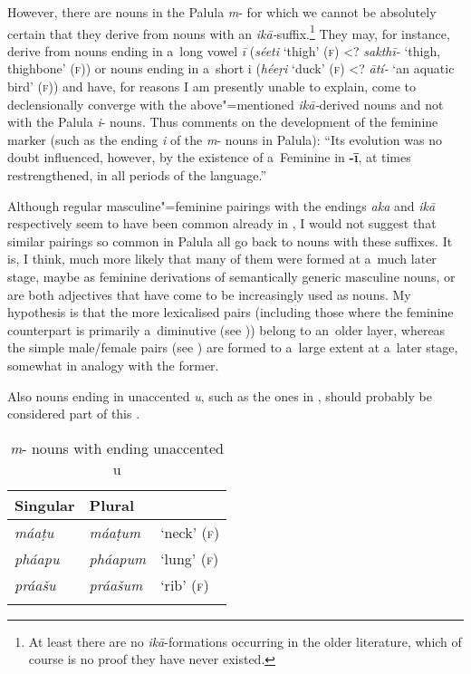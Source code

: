However, there are nouns in the Palula \textit{m}- for which we cannot be absolutely
certain that they derive from  nouns with an \textit{ikā-}suffix.\footnote{At least there are
  no \textit{ikā}-formations occurring in the older literature, which of course is no proof
  they have never existed.} They may, for instance, derive from nouns ending in a~long vowel
\textit{ī} (\textit{séeti} `thigh' (\textsc{f}) {\textless}? \textit{sakthī-} `thigh, thighbone' (\textsc{f})) or nouns ending in a~short i (\textit{héeṛi} `duck'
(\textsc{f}) {\textless}? \textit{ātí-} `an aquatic bird' (\textsc{f})) and have, for
reasons I am presently unable to explain, come to declensionally converge with the above"=mentioned
\textit{ikā-}derived nouns and not with the Palula \textit{i}- nouns. Thus
\citet[222]{masica1991} comments on the development of the  feminine marker (such as the ending
\textit{i} of the \textit{m}- nouns in Palula): ``Its evolution was no doubt influenced,
however, by the existence of a~Feminine in \textbf{-ī}, at times
restrengthened, in all periods of the language.''


Although regular masculine"=feminine pairings with the endings \textit{aka} and \textit{ikā}
respectively seem to have been common already in , I would not suggest that similar pairings so
common in Palula all go back to nouns with these suffixes. It is, I think, much more likely that
many of them were formed at a~much later stage, maybe as feminine derivations of semantically
generic masculine nouns, or are both adjectives that have come to be increasingly used as nouns. My
hypothesis is that the more lexicalised pairs (including those where the feminine counterpart is
primarily a~diminutive (see )) belong to an~older layer, whereas the simple
male/female pairs (see ) are formed to a~large extent at a~later stage, somewhat in
analogy with the former.


Also nouns ending in unaccented \textit{u}, such as the ones in , should probably be considered part of this . 



\begin{table}[ht]
\caption{\textit{m}- nouns with ending unaccented u}
\begin{tabularx}{\textwidth}{ Q Q Q }
\lsptoprule
Singular &
Plural &
\\\hline
\textit{máaṭu} &
\textit{máaṭum} &
`neck' (\textsc{f})\\
\textit{pháapu} &
\textit{pháapum} &
`lung' (\textsc{f})\\
\textit{práašu} &
\textit{práašum} &
`rib' (\textsc{f})\\\lspbottomrule
\end{tabularx}
\label{tab:4-17}
\end{table}

